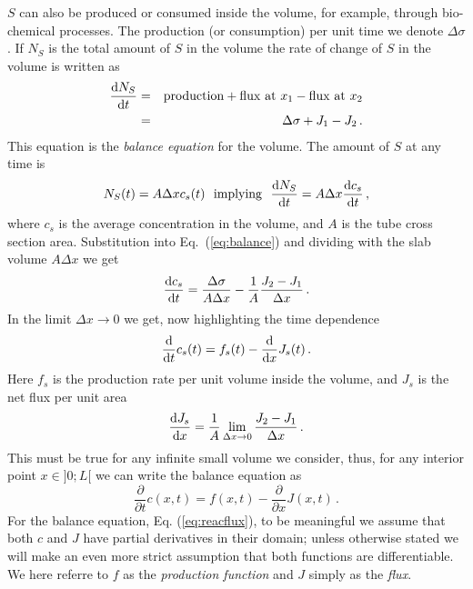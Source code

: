 $S$ can also be produced or consumed inside the volume, for example, through bio-chemical processes. 
The production (or consumption) per unit time we denote $\Delta \sigma$. 
If $N_S$ is the total amount of $S$ in the volume the rate of change of $S$ in the volume is written as
\begin{eqnarray}
	\frac{\d N_S}{\d t} &=& \mathrm{production} + \mathrm{flux \ at} \ x_1 -
	\mathrm{flux \ at} \ x_2 \nonumber \\
	&=& \Delta \sigma + J_1 - J_2 \, . \label{eq:balance}
\end{eqnarray}
This equation is the \emph{balance equation} for the volume. The amount of $S$ at any time is 
\begin{equation}
	N_S(t) = A \Delta x c_s(t) \ \ \mathrm{implying} \ \ \frac{\d N_S}{\d t} = A \Delta
	x \frac{\d c_s}{\d t} \, ,
\end{equation}
where $c_s$ is the average concentration in the volume, and $A$ is the tube cross section area. 
Substitution into Eq.~(\ref{eq:balance}) and dividing with the slab volume $A \Delta x$ we get
\begin{equation}
	\frac{\mathrm{d} c_s}{\mathrm{d} t} = \frac{\Delta \sigma}{A \Delta x} - \frac{1}{A} \frac{J_2
	-J_1}{\Delta x} \, .
\end{equation}
In the limit $\Delta x \rightarrow 0$ we get, now highlighting the time dependence 
\begin{equation}
	\frac{\mathrm{d}}{\mathrm{d} t} c_s(t) = f_s(t) - \frac{\mathrm{d}}{\mathrm{d} x}J_s(t) \, . 
\end{equation}
Here $f_s$ is the production rate per unit volume inside the volume, and $J_s$ is
the net flux per unit area
\begin{equation}
	\frac{\mathrm{d}  J_s}{\mathrm{d} x} = \frac{1}{A}\lim_{\Delta x \rightarrow 0} \frac{J_2-J_1}{\Delta x} \, .
\end{equation}
This must be true for any infinite small volume we consider, thus, for any interior point $x \in ]0; L[$
we can write the balance equation as
\begin{equation}
	\label{eq:reacflux}
	\frac{\partial}{\partial t} c(x,t)= f(x,t) - \frac{\partial}{\partial x}J(x,t)
	\,  .
\end{equation}
For the balance equation, Eq. (\ref{eq:reacflux}), to be meaningful we assume
that both $c$ and $J$ have partial derivatives in their domain; unless otherwise
stated we will make an even more strict assumption that both functions are
differentiable. We here referre to $f$ as the \emph{production function} and $J$ 
simply as the \emph{flux}.

